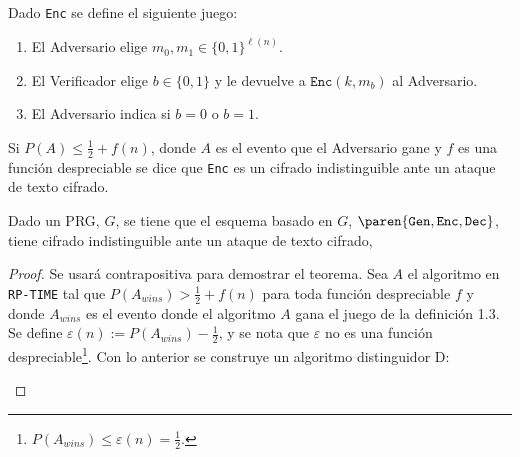 \documentclass{ayudantia}
\begin{document}
\begin{defn}
    Dado \texttt{Enc} se define el siguiente juego:
    \begin{enumerate}
        \item El Adversario elige \(m_0,m_1\in\{0,1\}^{\ell(n)}\).
        \item El Verificador elige \(b\in\{0,1\}\) y le devuelve a \(\texttt{Enc}(k,m_b)\) al Adversario.
        \item El Adversario indica si \(b=0\) o \(b=1\).
    \end{enumerate}
    Si \(P(A)\leq\frac12+f(n)\), donde \(A\) es el evento que el Adversario gane y \(f\) es una función despreciable se dice que \texttt{Enc} es un cifrado indistinguible ante un ataque de texto cifrado.
\end{defn}

\begin{thm}
    Dado un PRG, \(G\), se tiene que el esquema basado en \(G\), \(\paren{\texttt{Gen},\texttt{Enc},\texttt{Dec}}\), tiene cifrado indistinguible ante un ataque de texto cifrado,
\end{thm}
\begin{proof}
    Se usará contrapositiva para demostrar el teorema. Sea \(A\) el algoritmo en \texttt{RP-TIME} tal que \(P(A_{wins})>\frac12+f(n)\) para toda función despreciable \(f\) y donde \(A_{wins}\) es el evento donde el algoritmo \(A\) gana el juego de la definición 1.3. Se define \(\varepsilon(n):=P(A_{wins})-\frac12\), y se nota que \(\varepsilon\) no es una función despreciable\footnote{\(P(A_{wins})\leq\varepsilon(n)=\frac12\).}. Con lo anterior se construye un algoritmo distinguidor D:
\begin{center}
    \fbox{\begin{minipage}{15em}

    \end{minipage}}
\end{center}
\end{proof}
\end{document}
